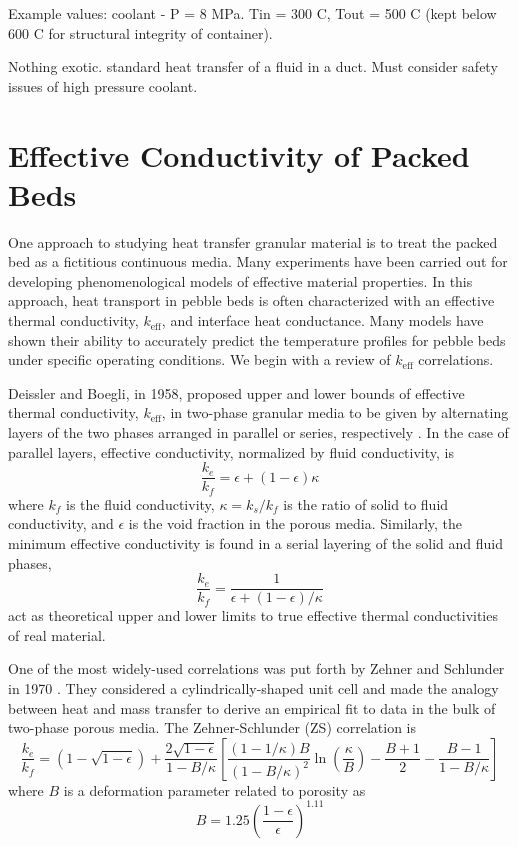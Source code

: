 \documentclass[11pt]{report} %
\begin{document}
Example values: coolant - P = 8 MPa. Tin = 300 C, Tout = 500 C (kept below 600 C for structural integrity of container).

Nothing exotic. standard heat transfer of a fluid in a duct. Must consider safety issues of high pressure coolant.

\section{Effective Conductivity of Packed Beds}
One approach to studying heat transfer granular material is to treat the packed bed as a fictitious continuous media. Many experiments have been carried out for developing phenomenological models of effective material properties. In this approach, heat transport in pebble beds is often characterized with an effective thermal conductivity, $k_\text{eff}$, and interface heat conductance. Many models have shown their ability to accurately predict the temperature profiles for pebble beds under specific operating conditions. We begin with a review of $k_\text{eff}$ correlations.

Deissler and Boegli, in 1958, proposed upper and lower bounds of effective thermal conductivity, $k_\text{eff}$, in two-phase granular media to be given by alternating layers of the two phases arranged in parallel or series, respectively \cite{Deissler1958}. In the case of parallel layers, effective conductivity, normalized by fluid conductivity, is
\begin{equation}\label{eq:keff-parallel}
	\frac{k_e}{k_f} = \epsilon + (1-\epsilon)\kappa
\end{equation}
where $k_f$ is the fluid conductivity, $\kappa = k_s/k_f$ is the ratio of solid to fluid conductivity, and $\epsilon$ is the void fraction in the porous media. Similarly, the minimum effective conductivity is found in a serial layering of the solid and fluid phases,
\begin{equation}\label{eq:keff-series}
	\frac{k_e}{k_f} = \frac{1}{\epsilon + (1-\epsilon)/\kappa}
\end{equation}
 act as theoretical upper and lower limits to true effective thermal conductivities of real material.

One of the most widely-used correlations was put forth by Zehner and Schlunder in 1970 \cite{Zehner1970,Zehner1972}. They considered a cylindrically-shaped unit cell and made the analogy between heat and mass transfer to derive an empirical fit to data in the bulk of two-phase porous media. The Zehner-Schlunder (ZS) correlation is
\begin{equation}
    \frac{k_e}{k_f} = \left(1-\sqrt{1-\epsilon}\right)+\frac{2\sqrt{1-\epsilon}}{1-B/\kappa}\left[\frac{(1-1/\kappa)B}{(1-B/\kappa)^2}\ln\left( \frac{\kappa}{B} \right) - \frac{B+1}{2} - \frac{B-1}{1-B/\kappa}\right]
\end{equation}
where $B$ is a deformation parameter related to porosity as
\begin{equation}\label{eq:zs-B}
    B = 1.25\left(\frac{1-\epsilon}{\epsilon}\right)^{1.11}
\end{equation}
\end{document}
